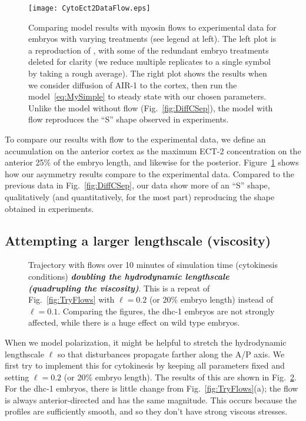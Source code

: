 \documentclass[11pt]{article}
\begin{document}
\begin{figure}
\centering
\texttt{[image: CytoEct2DataFlow.eps]}
\caption{\label{fig:ExpFlow} Comparing model results with myosin flows to experimental data for embryos with varying treatments (see legend at left). The left plot is a reproduction of \cite[Fig.~7A]{longhini2022aurora}, with some of the redundant embryo treatments deleted for clarity (we reduce multiple replicates to a single symbol by taking a rough average). The right plot shows the results when we consider diffusion of AIR-1 to the cortex, then run the model\ \eqref{eq:MySimple} to steady state with our chosen parameters. Unlike the model without flow (Fig.\ \ref{fig:DiffCSep}), the model with flow reproduces the ``S'' shape observed in experiments.}
\end{figure}

To compare our results with flow to the experimental data, we define an accumulation on the anterior cortex as the maximum ECT-2 concentration on the anterior 25\% of the embryo length, and likewise for the posterior. Figure\ \ref{fig:ExpFlow} shows how our asymmetry results compare to the experimental data. Compared to the previous data in Fig.\ \ref{fig:DiffCSep}, our data show more of an ``S'' shape, qualitatively (and quantitatively, for the most part) reproducing the shape obtained in experiments.

\subsection{Attempting a larger lengthscale (viscosity)}
\begin{figure}
\centering
{}
\caption{\label{fig:TryFlowsL} Trajectory with flows over 10 minutes of simulation time (cytokinesis conditions) \textbf{\textit{doubling the hydrodynamic lengthscale (quadrupling the viscosity)}}. This is a repeat of Fig.\ \ref{fig:TryFlows} with $\ell=0.2$ (or 20\% embryo length) instead of $\ell=0.1$. Comparing the figures, the dhc-1 embryos are not strongly affected, while there is a huge effect on wild type embryos.}
\end{figure}

When we model polarization, it might be helpful to stretch the hydrodynamic lengthscale $\ell$ so that disturbances propagate farther along the A/P axis. We first try to implement this for cytokinesis by keeping all parameters fixed and setting $\ell=0.2$ (or 20\% embryo length). The results of this are shown in Fig.\ \ref{fig:TryFlowsL}. For the dhc-1 embryos, there is little change from Fig.\ \ref{fig:TryFlows}(a); the flow is always anterior-directed and has the same magnitude. This occurs because the profiles are sufficiently smooth, and so they don't have strong viscous stresses.
\end{document}
